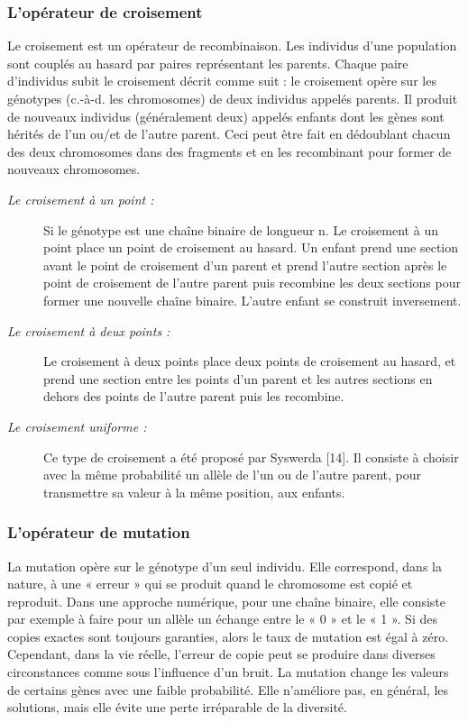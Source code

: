 \documentclass[12pt,a4paper]{article}
\begin{document}
	\subsubsection{L’opérateur de croisement}
	Le croisement est un opérateur de recombinaison. Les individus d’une population sont couplés au hasard par paires représentant les parents. Chaque paire d’individus
subit le croisement décrit comme suit : le croisement opère sur les génotypes (c.-à-d. les chromosomes) de deux individus appelés parents. Il produit de nouveaux individus (généralement deux) appelés enfants dont les gènes sont hérités de l’un ou/et de l’autre parent. Ceci peut être fait en dédoublant chacun des deux chromosomes dans des fragments et en les recombinant pour former de nouveaux chromosomes.
	\begin{description}
		\item[\textsl{Le croisement à un point :}] Si le génotype est une chaîne binaire de longueur n. Le croisement à un point place un point de croisement au
hasard. Un enfant prend une section avant le point de croisement d’un parent et prend l’autre section après le point de croisement de l’autre parent puis recombine les deux sections pour former une nouvelle chaîne binaire. L’autre enfant se construit inversement. 
		
		\item[\textsl{Le croisement à deux points :}]Le croisement à deux points place deux points de croisement au hasard, et prend une section entre les points d’un parent et les autres sections en dehors des points de l’autre parent puis les recombine. 
	
		\item[\textsl{Le croisement uniforme :}]Ce type de croisement a été proposé par Syswerda [14]. Il consiste à choisir avec la même probabilité un allèle de l’un ou de l’autre parent, pour transmettre sa valeur à la même position, aux enfants. 
	
	\end{description}
	
	\subsubsection{L'opérateur de mutation}
	
	La mutation opère sur le génotype d’un seul individu. Elle correspond, dans la nature, à une « erreur » qui se produit quand le chromosome est copié et reproduit. Dans une approche numérique, pour une chaîne binaire, elle consiste par exemple à faire pour un allèle un échange entre le « 0 » et le « 1 ». Si des copies exactes sont toujours garanties, alors le taux de mutation est égal à zéro. Cependant, dans la vie réelle, l’erreur de copie peut se produire dans diverses circonstances comme sous l’influence d’un bruit. La mutation change les valeurs de certains gènes avec une faible probabilité. Elle n’améliore pas, en général, les solutions, mais elle évite une perte irréparable de la diversité.
	
\end{document}
